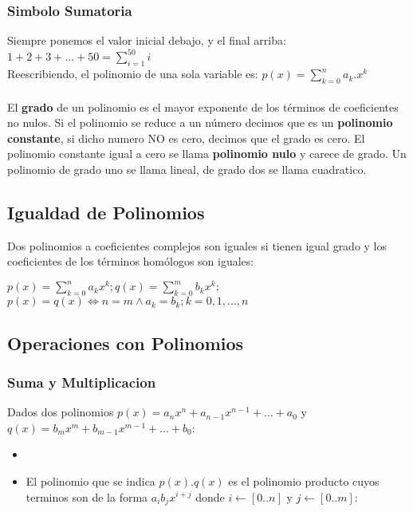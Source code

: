 \documentclass[10pt]{article}
\begin{document}
\subsubsection{Simbolo Sumatoria}
Siempre ponemos el valor inicial debajo, y el final arriba: $1+2+3+...+50 = \sum\limits_{i=1}^{50}i$\\
Reescribiendo, el polinomio de una sola variable es: $p(x)=\sum\limits_{k=0}^na_k.x^k$\\ \\
El \textbf{grado} de un polinomio es el mayor exponente de los términos de coeficientes no nulos. Si el polinomio se reduce a un número decimos que es un \textbf{polinomio constante}, si dicho numero NO es cero, decimos que el grado es cero. El polinomio constante igual a cero se llama \textbf{polinomio nulo} y carece de grado. Un polinomio de grado uno se llama lineal, de grado dos se llama cuadratico.
\subsection{Igualdad de Polinomios}
Dos polinomios a coeficientes complejos son iguales si tienen igual grado y los coeficientes de los términos homólogos son iguales:
\begin{center}
$p(x) = \sum\limits_{k=0}^na_kx^k; q(x) = \sum\limits_{k=0}^mb_kx^k;$\\
$p(x) = q(x) \iff n=m \land a_k = b_k; k = 0,1,...,n$
\end{center}
\subsection{Operaciones con Polinomios}
\subsubsection{Suma y Multiplicacion}
Dados dos polinomios $p(x)=a_nx^n+a_{n-1}x^{n-1}+...+a_0$ y $q(x)=b_mx^m+b_{m-1}x^{m-1}+...+b_0$:
\begin{itemize}
\item {}
\item El polinomio que se indica $p(x).q(x)$ es el polinomio producto cuyos terminos son de la forma $a_ib_jx^{i+j}$ donde $i\leftarrow[0..n]$ y $j\leftarrow[0..m]$:\\
\end{itemize}
\end{document}
